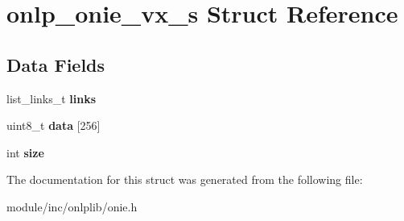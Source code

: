 \hypertarget{structonlp__onie__vx__s}{\section{onlp\+\_\+onie\+\_\+vx\+\_\+s Struct Reference}
\label{structonlp__onie__vx__s}
}
\subsection*{Data Fields}
\begin{DoxyCompactItemize}
\item 
\hypertarget{structonlp__onie__vx__s_a3da607f325b843761b86acdb24ed7a15}{list\+\_\+links\+\_\+t {\bfseries links}}\label{structonlp__onie__vx__s_a3da607f325b843761b86acdb24ed7a15}

\item 
\hypertarget{structonlp__onie__vx__s_a168deb7b96b746cdb3ac32016dd4acd1}{uint8\+\_\+t {\bfseries data} \mbox{[}256\mbox{]}}\label{structonlp__onie__vx__s_a168deb7b96b746cdb3ac32016dd4acd1}

\item 
\hypertarget{structonlp__onie__vx__s_a72ac2dafa901382b351ba5b0a870e1b7}{int {\bfseries size}}\label{structonlp__onie__vx__s_a72ac2dafa901382b351ba5b0a870e1b7}

\end{DoxyCompactItemize}


The documentation for this struct was generated from the following file\+:\begin{DoxyCompactItemize}
\item 
module/inc/onlplib/onie.\+h\end{DoxyCompactItemize}
